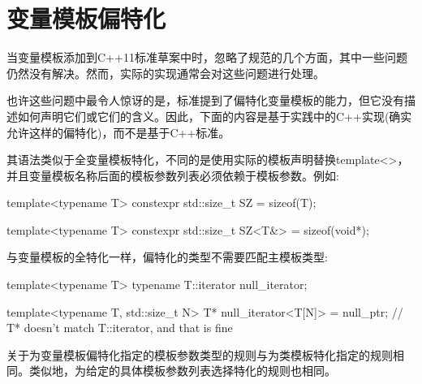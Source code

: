 \section{变量模板偏特化}
当变量模板添加到C++11标准草案中时，忽略了规范的几个方面，其中一些问题仍然没有解决。然而，实际的实现通常会对这些问题进行处理。

也许这些问题中最令人惊讶的是，标准提到了偏特化变量模板的能力，但它没有描述如何声明它们或它们的含义。因此，下面的内容是基于实践中的C++实现(确实允许这样的偏特化)，而不是基于C++标准。

其语法类似于全变量模板特化，不同的是使用实际的模板声明替换template<>，并且变量模板名称后面的模板参数列表必须依赖于模板参数。例如:

\begin{cpp}
template<typename T> constexpr std::size_t SZ = sizeof(T);

template<typename T> constexpr std::size_t SZ<T&> = sizeof(void*);
\end{cpp}

与变量模板的全特化一样，偏特化的类型不需要匹配主模板类型:

\begin{cpp}
template<typename T> typename T::iterator null_iterator;

template<typename T, std::size_t N> T* null_iterator<T[N]> = null_ptr;
// T* doesn’t match T::iterator, and that is fine
\end{cpp}

关于为变量模板偏特化指定的模板参数类型的规则与为类模板特化指定的规则相同。类似地，为给定的具体模板参数列表选择特化的规则也相同。




































